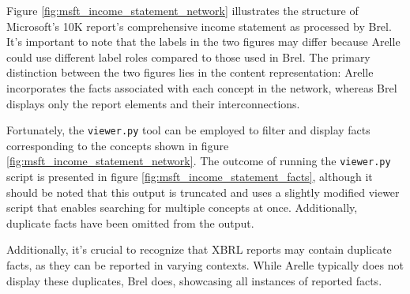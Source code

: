 

Figure \ref{fig:msft_income_statement_network} illustrates the structure of Microsoft's 10K report's comprehensive income statement as processed by Brel.  
It's important to note that the labels in the two figures may differ because Arelle could use different label roles compared to those used in Brel.  
The primary distinction between the two figures lies in the content representation: Arelle incorporates the facts associated with each concept in the network,  
whereas Brel displays only the report elements and their interconnections.

Fortunately, the \texttt{viewer.py} tool can be employed to filter and display facts corresponding to the concepts shown in figure \ref{fig:msft_income_statement_network}.  
The outcome of running the \texttt{viewer.py} script is presented in figure \ref{fig:msft_income_statement_facts},  
although it should be noted that this output is truncated and uses a slightly modified viewer script that enables searching for multiple concepts at once.
Additionally, duplicate facts have been omitted from the output.

Additionally, it's crucial to recognize that XBRL reports may contain duplicate facts, as they can be reported in varying contexts.  
While Arelle typically does not display these duplicates, Brel does, showcasing all instances of reported facts.

